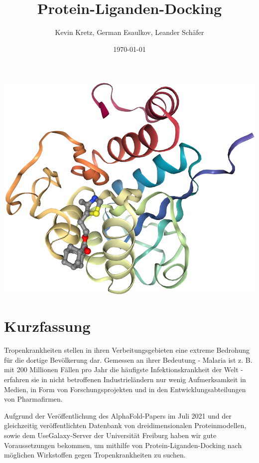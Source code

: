 \documentclass[11pt]{article}
\title{Protein-Liganden-Docking}
\author{Kevin Kretz, German Esaulkov, Leander Schäfer}
\date{\today}
\begin{document}
    \maketitle

    \includegraphics[width=\linewidth]{protein-ligand}

    \pagebreak

    \tableofcontents


    \section{Kurzfassung}



    Tropenkrankheiten stellen in ihren Verbeitungsgebieten eine extreme Bedrohung für die dortige Bevölkerung dar. Gemessen an ihrer Bedeutung - Malaria ist z. B. mit 200 Millionen Fällen pro Jahr die häufigste Infektionskrankheit der Welt  - erfahren sie in nicht betroffenen Industrieländern nur wenig Aufmerksamkeit in Medien, in Form von Forschungsprojekten und in den Entwicklungsabteilungen von Pharmafirmen.

    Aufgrund der Veröffentlichung des AlphaFold-Papers im Juli 2021 und der gleichzeitig veröffentlichten Datenbank von dreidimensionalen Proteinmodellen, sowie dem UseGalaxy-Server der Universität Freiburg haben wir gute Voraussetzungen bekommen, um mithilfe von Protein-Liganden-Docking nach möglichen Wirkstoffen gegen Tropenkrankheiten zu suchen.


\end{document}
